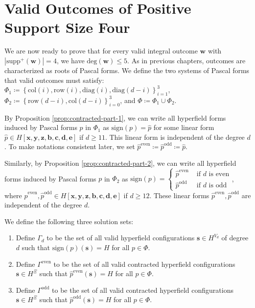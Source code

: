 \chapter{Valid Outcomes of Positive Support
Size Four}

We are now ready to prove that for every valid integral outcome \( \mathbf{w} \) with \( |\mathrm{supp}^+(\mathbf{w})| = 4 \), we have \( \mathrm{deg}(\mathbf{w}) \leq 5 \). As in previous chapters, outcomes are characterized as roots of Pascal forms. We define the two systems of Pascal forms that valid outcomes must satisfy: \( \Phi_1 \coloneqq \left\{ \mathrm{col}(i), \mathrm{row}(i), \mathrm{diag}(i), \mathrm{diag}(d-i) \right\}_{i=1}^3 \), \( \Phi_2 \coloneqq \left\{ \mathrm{row}(d-i), \mathrm{col}(d-i) \right\}_{i=0}^3 \), and \( \Phi \coloneqq \Phi_1 \cup \Phi_2 \).

By Proposition \ref{prop:contracted-part-1}, we can write all hyperfield forms induced by Pascal forms \( p \) in \( \Phi_1 \) as \( \mathrm{sign}(p) = \hat p \)
for some linear form \( \hat p \in H[\mathbf{x}, \mathbf{y}, \mathbf{z}, \mathbf{b}, \mathbf{c}, \mathbf{d}, \mathbf{e}] \) if \( d \geq 11 \). This linear form is independent of the degree \( d \). To make notations consistent later, we set \( \hat p^{\mathrm{even}} \coloneqq  \hat p^{\mathrm{odd}}  \coloneqq \hat p\).

Similarly, by Proposition \ref{prop:contracted-part-2}, we can write all hyperfield forms induced by Pascal forms \( p \) in \( \Phi_2 \) as \( \mathrm{sign}(p) = \begin{cases}
    \hat p^{\mathrm{even}} & \text{ if } d \text{ is even} \\
    \hat p^{\mathrm{odd}} & \text{ if } d \text{ is odd}
\end{cases} \), where \( \hat p^{\mathrm{even}}, \hat p^{\mathrm{odd}} \in H[\mathbf{x}, \mathbf{y}, \mathbf{z}, \mathbf{b}, \mathbf{c}, \mathbf{d}, \mathbf{e}] \) if \( d \geq 12 \). These linear forms \( \hat p^{\mathrm{even}}, \hat p^{\mathrm{odd}}  \) are independent of the degree \( d \).

\begin{definition}\label{def:sdjsndjknsdj}
    We define the following three solution sets:
    \begin{enumerate}
        \item     Define \( \Gamma_d \) to be the set of all valid hyperfield configurations \( \mathbf{s} \in H^{V_d} \) of degree \( d \) such that \( \mathrm{sign}(p)(\mathbf{s}) = H \) for all \( p \in \Phi \).

        \item     Define \( \Gamma^{\mathrm{even}} \) to be the set of all valid contracted hyperfield configurations \( \mathbf{s} \in H^{\Xi} \) such that \( \hat p^{\mathrm{even}}(\mathbf{s}) = H \) for all \( p \in \Phi \).

        \item     Define \( \Gamma^{\mathrm{odd}} \) to be the set of all valid contracted hyperfield configurations \( \mathbf{s} \in H^{\Xi} \) such that \( \hat p^{\mathrm{odd}}(\mathbf{s}) = H \) for all \( p \in \Phi \).
    \end{enumerate}
\end{definition}

